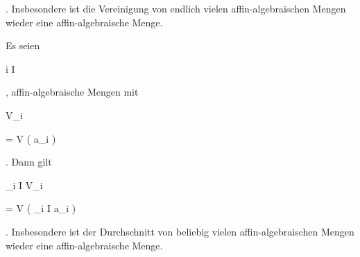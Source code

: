 {{{{{ } {
}


{ } {
}


{ } {
}


}
{}{}{.}
Insbesondere ist die Vereinigung von endlich vielen affin-algebraischen Mengen wieder eine affin-algebraische Menge.
}{Es seien


 {}


 {i \in I} {}


 {} {} {} {,}
affin-algebraische Mengen mit


\mavergleichskette


{\vergleichskette


{ V_i
}


{ = }{ V \left(  {\mathfrak a}_i  \right)
}


{  }{
}


{    }{
}


{   }{
}


}
{}{}{.}
Dann gilt


\mavergleichskettedisp


{\vergleichskette


{ \bigcap_{i \in I} V_i
}


{ =} { V \left(  \sum_{i \in I} {\mathfrak a}_i  \right)
}


{ } {
}


{ } {
}


{ } {
}


}
{}{}{.}
Insbesondere ist der Durchschnitt von beliebig vielen affin-algebra\-ischen Mengen wieder eine affin-algebraische Menge.}}


\faktzusatz {}


\faktzusatz {}


}


